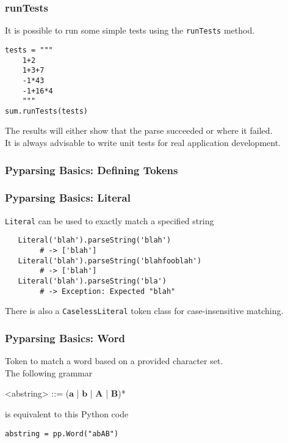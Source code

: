 \documentclass{beamer}
\begin{document}
\begin{frame}[fragile]
\frametitle{runTests}
It is possible to run some simple tests using the \texttt{runTests} method.

\begin{verbatim}
tests = """
    1+2
    1+3+7
    -1*43
    -1+16*4
    """
sum.runTests(tests)
\end{verbatim}
The results will either show that the parse succeeded or where it failed. \\
\medskip
It is always advisable to write unit tests for real application development.
\end{frame}


\begin{frame}
\frametitle{Pyparsing Basics: Defining Tokens}
\begin{center}
\end{center}
\end{frame}



\begin{frame}[fragile]
\frametitle{Pyparsing Basics: Literal}
\texttt{Literal} can be used to exactly match a specified string
\begin{verbatim}
   Literal('blah').parseString('blah')  
        # -> ['blah']
   Literal('blah').parseString('blahfooblah')  
        # -> ['blah']
   Literal('blah').parseString('bla')  
        # -> Exception: Expected "blah"
\end{verbatim}
There is also a \texttt{CaselessLiteral} token class for case-insensitive matching.
\end{frame}

\begin{frame}[fragile]
 \frametitle{Pyparsing Basics: Word}
Token to match a word based on a provided character set. \\ 
\bigskip
The following grammar 
\begin{grammar}
<abstring> ::= ($\mathbf{a}$ | $\mathbf{b}$ | $\mathbf{A}$ | $\mathbf{B}$)*
 \end{grammar} 
\bigskip
is equivalent to this Python code
\begin{verbatim}
abstring = pp.Word("abAB")
 \end{verbatim}

\end{frame}
\end{document}
